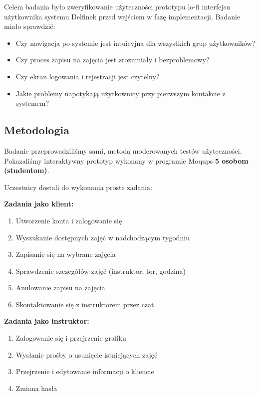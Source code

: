 \documentclass[a4paper,12pt]{article}
\begin{document}
Celem badania było zweryfikowanie użyteczności prototypu lo-fi interfejsu użytkownika systemu Delfinek przed wejściem w fazę implementacji. Badanie miało sprawdzić:
 
\begin{itemize}
    \item Czy nawigacja po systemie jest intuicyjna dla wszystkich grup użytkowników?
    \item Czy proces zapisu na zajęcia jest zrozumiały i bezproblemowy?
    \item Czy ekran logowania i rejestracji jest czytelny?
    \item Jakie problemy napotykają użytkownicy przy pierwszym kontakcie z systemem?
\end{itemize}
 
\subsection{Metodologia}
 
Badanie przeprowadziliśmy sami, metodą moderowanych testów użyteczności. Pokazaliśmy interaktywny prototyp wykonany w programie Moqups \textbf{5 osobom (studentom)}.
 
Uczestnicy dostali do wykonania proste zadania:
 
\vspace{0.3cm}
\noindent\textbf{Zadania jako klient:}
\begin{enumerate}
    \item Utworzenie konta i zalogowanie się
    \item Wyszukanie dostępnych zajęć w nadchodzącym tygodniu
    \item Zapisanie się na wybrane zajęcia
    \item Sprawdzenie szczegółów zajęć (instruktor, tor, godzina)
    \item Anulowanie zapisu na zajęcia
    \item Skontaktowanie się z instruktorem przez czat
\end{enumerate}
 
\vspace{0.3cm}
\noindent\textbf{Zadania jako instruktor:}
\begin{enumerate}
    \item Zalogowanie się i przejrzenie grafiku
    \item Wysłanie prośby o usunięcie istniejących zajęć
    \item Przejrzenie i edytowanie informacji o kliencie
    \item Zmiana hasła
\end{enumerate}
 
\end{document}
